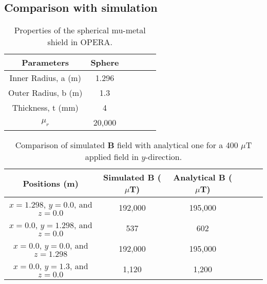 \subsection{Comparison with simulation}

\begin{table} [!htb]
    \centering
    \begin{tabular} { |c|c|c|c|c|c|} 
        \hline
        Parameters & Sphere \\
        \hline\hline
        Inner Radius, a (m) & 1.296\\ 
        \hline
        Outer Radius, b (m) & 1.3 \\ 
        \hline
        Thickness, t (mm) & 4 \\ 
        \hline
        $\mu_r$  & 20,000 \\ 
        \hline

    \end{tabular}
    \caption{Properties of the spherical mu-metal shield in OPERA.}\label{tablE:opera_sphere}
\end{table}

\begin{table} [!htb]
    \centering
    \begin{tabular} { |c|c|c|c|c|c|} 
        \hline
        Positions (m) & Simulated $\bm{B}$ ($\mu$T) & Analytical $\bm{B}$ ($\mu$T)\\
        \hline\hline
        $x=1.298$, $y=0.0$, and $z=0.0$ & 192,000 & 195,000\\ 
        \hline
        $x=0.0$, $y=1.298$, and $z=0.0$ & 537 & 602\\ 
        \hline
        $x=0.0$, $y=0.0$, and $z=1.298$ & 192,000 & 195,000\\ 
        \hline
        $x=0.0$, $y=1.3$, and $z=0.0$ & 1,120 & 1,200\\ 
        \hline

    \end{tabular}
    \caption[Comparison of simulated $\bm{B}$ field with analytical one ]{Comparison of simulated $\bm{B}$ field with analytical one for a 400 $\mu$T applied field in $y$-direction.}\label{tablE:opera_analytical}
\end{table}

